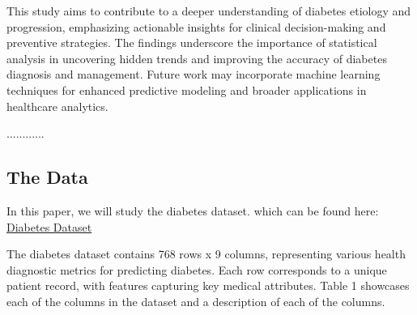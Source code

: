 \documentclass[12pt]{article}
\begin{document}
This study aims to contribute to a deeper understanding of diabetes etiology and progression, emphasizing actionable insights for clinical decision-making and preventive strategies. The findings underscore the importance of statistical analysis in uncovering hidden trends and improving the accuracy of diabetes diagnosis and management. Future work may incorporate machine learning techniques for enhanced predictive modeling and broader applications in healthcare analytics.

............
\subsection{The Data}

In this paper, we will study the diabetes dataset. \cite{Kaggles} which can be found here: \href{https://www.kaggle.com/datasets/hasibur013/diabetes-dataset}{Diabetes Dataset}

The diabetes dataset contains 768 rows x 9 columns, representing various health diagnostic metrics for predicting diabetes. Each row corresponds to a unique patient record, with features capturing key medical attributes. Table 1 showcases each of the columns in the dataset and a description of each of the columns.


\begin{table}[h!]
	\centering
	\caption{Description of the Diabetes Dataset}
\end{table}
\end{document}
